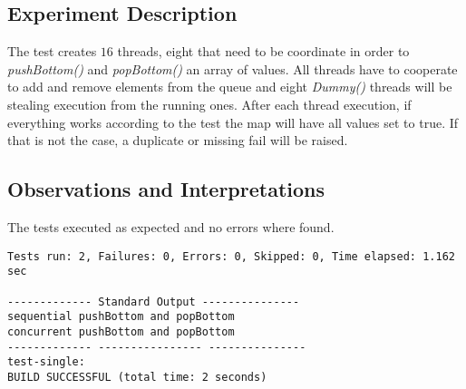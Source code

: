 \subsection{Experiment Description} 
\par
The test creates $16$ threads, eight that need to be coordinate in order to \textit{pushBottom()} and \textit{popBottom()} an array of values. All threads have to cooperate to add and remove elements from the queue and eight \textit{Dummy()} threads will be stealing execution from the running ones. After each thread execution, if everything works according to the test the map will have all values set to true.
If that is not the case, a duplicate or missing fail will be raised.
\par



\subsection{Observations and Interpretations}

\par
The tests executed as expected and no errors where found.
\begin{lstlisting}[frame=single,breaklines=true]
Tests run: 2, Failures: 0, Errors: 0, Skipped: 0, Time elapsed: 1.162 sec

------------- Standard Output ---------------
sequential pushBottom and popBottom
concurrent pushBottom and popBottom
------------- ---------------- ---------------
test-single:
BUILD SUCCESSFUL (total time: 2 seconds)
\end{lstlisting}




